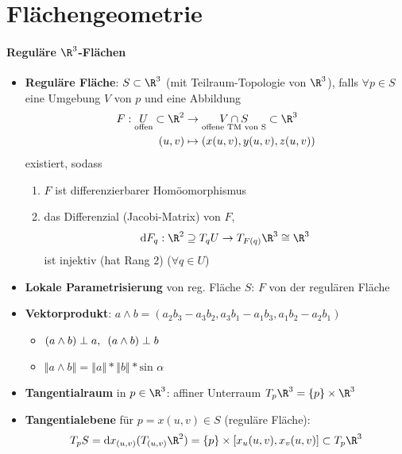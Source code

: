 \section{Flächengeometrie}

\paragraph{Reguläre \( \R^3 \)-Flächen}
\begin{itemize}
  \item \textbf{Reguläre Fläche}: \( S \subset \R^3 \) (mit Teilraum-Topologie von \( \R^3 \)), falls \( \forall p \in S \) eine Umgebung \( V \) von \( p \) und eine Abbildung
  \begin{align*}
    F : \underset{\text{offen}}{U} \subset \R^2 &\to \underset{\text{offene TM von S}}{V \cap S} \subset \R^3 \\
    (u,v) &\mapsto (x(u,v),y(u,v),z(u,v))
  \end{align*}
  existiert, sodass
  \begin{enumerate}
    \item \( F \) ist differenzierbarer Homöomorphismus
    \item das Differenzial (Jacobi-Matrix) von \( F \),
    \begin{equation*}
      \text{d}F_q : \R^2 \supseteq T_q U \to T_{F(q)}\R^3 \cong \R^3
    \end{equation*}
    ist injektiv (hat Rang \( 2 \)) (\( \forall q \in U \))
  \end{enumerate}
  \item \textbf{Lokale Parametrisierung} von reg. Fläche \( S \): \( F \) von der regulären Fläche
  \item \textbf{Vektorprodukt}: \( a \wedge b = (a_2b_3 - a_3b_2, a_3b_1-a_1b_3,a_1b_2-a_2b_1) \)
  \begin{itemize}
    \item \( (a \wedge b) \perp a, \enskip (a \wedge b) \perp b \)
    \item \( \left\Vert a \wedge b \right\Vert = \left\Vert a \right\Vert * \left\Vert b \right\Vert * \text{sin }\alpha \)
  \end{itemize}
  \item \textbf{Tangentialraum} in \( p \in \R^3 \): affiner Unterraum \( T_p\R^3 = \left \{ p \right \} \times \R^3 \)
  \item \textbf{Tangentialebene} für \( p = x(u,v) \in S \) (reguläre Fläche):
  \begin{equation*}
    T_p S = \text{d}x_{(u,v)}(T_{(u,v)}\R^2) = \left \{ p \right \} \times [x_u(u,v),x_v(u,v)] \subset T_p\R^3
  \end{equation*}
\end{itemize}

